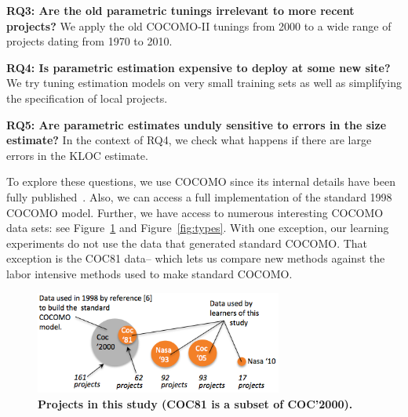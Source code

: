 \documentclass{sig-alternate}
\newcommand{\fig}[1]{Figure~\ref{fig:#1}}
\newenvironment{changed}{\par\color{MyDarkBlue}}{\par}
\newcommand{\ADD}[1]{\textcolor{MyDarkBlue}{{\bf #1}}}
\begin{document}
{\bf RQ3: Are the old parametric tunings irrelevant
  to more recent projects?}  We apply the old
COCOMO-II tunings from 2000 to a wide range of projects dating from
1970 to 2010.

{\bf RQ4: Is parametric estimation expensive to deploy  at some new site?}
We try   tuning estimation models on very small training sets 
as well as simplifying the specification of local projects.

{\bf RQ5: Are parametric estimates unduly sensitive to errors in the size estimate?}
In the context of RQ4, we check what happens
if there are large errors in the KLOC estimate.

\begin{changed}
To explore these questions, we use  COCOMO since its
internal details have been fully
published~\cite{boehm00b}. Also, we can access a full implementation of the standard 1998
COCOMO model.
Further, we have access to numerous interesting  COCOMO data
sets: see \fig{dataused} and \fig{types}.
With one exception, our learning experiments do not use the data
that generated   standard COCOMO.
That exception is the  COC81 data-- which  lets us  compare new methods
against the  labor intensive methods used to make standard COCOMO. 
\end{changed}


\begin{figure}[!t]
\begin{center}
\includegraphics[width=3.2in]{datasets1.png}
\end{center}
\caption{\ADD{Projects in this study (COC81 is a subset of COC'2000).}}\label{fig:dataused}
\end{figure}
\end{document}
